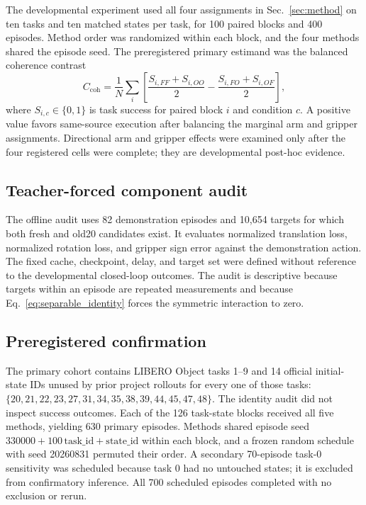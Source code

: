 The developmental experiment used all four assignments in Sec.~\ref{sec:method}
on ten tasks and ten matched states per task, for 100 paired blocks and 400
episodes. Method order was randomized within each block, and the four methods
shared the episode seed. The preregistered primary estimand was the balanced
coherence contrast
\begin{equation}
C_{\mathrm{coh}}=\frac{1}{N}\sum_i
\left[\frac{S_{i,FF}+S_{i,OO}}{2}
-\frac{S_{i,FO}+S_{i,OF}}{2}\right],
\label{eq:coherence}
\end{equation}
where $S_{i,c}\in\{0,1\}$ is task success for paired block $i$ and condition
$c$. A positive value favors same-source execution after balancing the
marginal arm and gripper assignments. Directional arm and gripper effects were
examined only after the four registered cells were complete; they are
developmental post-hoc evidence.

\subsection{Teacher-forced component audit}

The offline audit uses 82 demonstration episodes and 10,654 targets for which
both fresh and old20 candidates exist. It evaluates normalized translation
loss, normalized rotation loss, and gripper sign error against the
demonstration action. The fixed cache, checkpoint, delay, and target set were
defined without reference to the developmental closed-loop outcomes. The
audit is descriptive because targets within an episode are repeated
measurements and because Eq.~\eqref{eq:separable_identity} forces the symmetric
interaction to zero.

\subsection{Preregistered confirmation}

The primary cohort contains LIBERO Object tasks 1--9 and 14 official
initial-state IDs unused by prior project rollouts for every one of those tasks:
$\{20,21,22,23,27,31,34,35,38,39,44,45,47,48\}$. The identity audit did not
inspect success outcomes. Each of the
126 task-state blocks received all five methods, yielding 630 primary episodes.
Methods shared episode seed $330000+100\,\mathrm{task\_id}+\mathrm{state\_id}$
within each block, and a frozen random schedule with seed 20260831 permuted
their order. A secondary 70-episode task-0 sensitivity was scheduled
because task 0 had no untouched states; it is excluded from confirmatory
inference. All 700 scheduled episodes completed with no exclusion or rerun.


